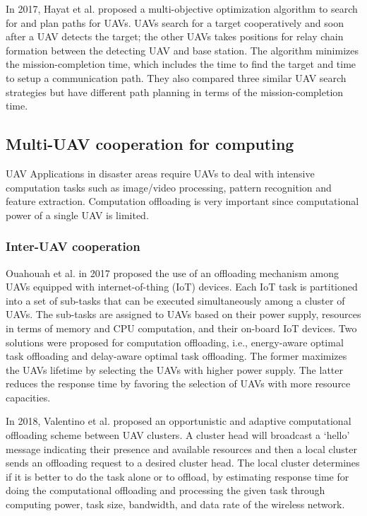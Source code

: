\documentclass{ieeeaccess}
\begin{document}
In 2017, Hayat et al. proposed a multi-objective optimization algorithm to search for and plan paths for UAVs\cite{Hayat 2017}. UAVs search for a target cooperatively and soon after a UAV detects the target; the other UAVs takes positions for relay chain formation between the detecting UAV and base station. The algorithm minimizes the mission-completion time, which includes the time to find the target and time to setup a communication path. They also compared three similar UAV search strategies but have different path planning in terms of the mission-completion time.

\subsection{Multi-UAV cooperation for computing}\label{compute}
UAV Applications in disaster areas require UAVs to deal with intensive computation tasks such as image/video processing, pattern recognition and feature extraction. 
Computation offloading is very important since computational power of a single UAV is limited.

\subsubsection{Inter-UAV cooperation}
Ouahouah et al. in 2017 proposed the use of an offloading mechanism among UAVs equipped with internet-of-thing (IoT) devices\cite{Ouahouah2017}. 
Each IoT task is partitioned into a set of sub-tasks that can be executed simultaneously among a cluster of UAVs. The sub-tasks are assigned to UAVs based on their power supply, resources in terms of memory and CPU computation, and their on-board IoT devices. 
Two solutions were proposed for computation offloading, i.e., energy-aware optimal task offloading and delay-aware optimal task offloading. 
The former maximizes the UAVs lifetime by selecting the UAVs with higher power supply. The latter reduces the response time by favoring the selection of UAVs with more resource capacities.

In 2018, Valentino et al. proposed an opportunistic and adaptive computational offloading scheme between UAV clusters\cite{Valentino2018}.
A cluster head will broadcast a `hello' message indicating their presence and available resources and then a local cluster sends an offloading request to a desired cluster head.
The local cluster determines if it is better to do the task alone or to offload, by estimating response time for doing the computational offloading and processing the given task through computing power, task size, bandwidth, and data rate of the wireless network.
\end{document}
